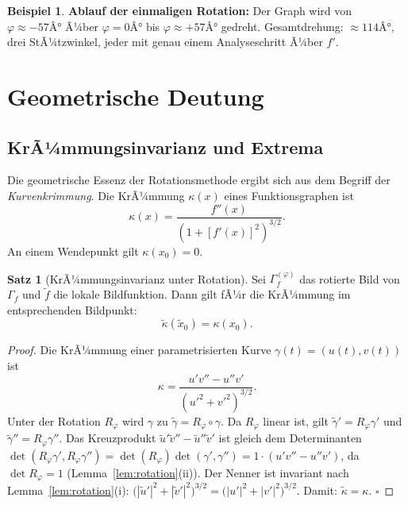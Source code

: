 ﻿\documentclass[12pt, a4paper]{article}
\theoremstyle{definition}
\newtheorem{satz}{Satz}[section]
\newtheorem{beispiel}{Beispiel}[section]
\begin{document}
\begin{beispiel}
		\textbf{Ablauf der einmaligen Rotation:}
		Der Graph wird von $\varphi \approx -57Â°$ Ã¼ber $\varphi = 0Â°$ bis
		$\varphi \approx +57Â°$ gedreht. Gesamtdrehung: $\approx 114Â°$,
		drei StÃ¼tzwinkel, jeder mit genau einem Analyseschritt Ã¼ber $f'$.
	\end{beispiel}
	
	\section{Geometrische Deutung}
	
	\subsection{KrÃ¼mmungsinvarianz und Extrema}
	
	Die geometrische Essenz der Rotationsmethode ergibt sich aus dem Begriff der
	\emph{Kurvenkrimmung}. Die KrÃ¼mmung $\kappa(x)$ eines Funktionsgraphen ist
	\[
	\kappa(x) = \frac{f''(x)}{\left(1 + [f'(x)]^2\right)^{3/2}}.
	\]
	An einem Wendepunkt gilt $\kappa(x_0) = 0$.
	
	\begin{satz}[KrÃ¼mmungsinvarianz unter Rotation]
		\label{satz:kruemmung}
		Sei $\Gamma_f^{(\varphi)}$ das rotierte Bild von $\Gamma_f$ und $\tilde{f}$
		die lokale Bildfunktion. Dann gilt fÃ¼r die KrÃ¼mmung im entsprechenden Bildpunkt:
		\[
		\tilde{\kappa}(\tilde{x}_0) = \kappa(x_0).
		\]
	\end{satz}
	
	\begin{proof}
		Die KrÃ¼mmung einer parametrisierten Kurve $\gamma(t) = (u(t), v(t))$ ist
		\[
		\kappa = \frac{u'v'' - u''v'}{(u'^2 + v'^2)^{3/2}}.
		\]
		Unter der Rotation $R_\varphi$ wird $\gamma$ zu $\tilde{\gamma} = R_\varphi \circ \gamma$.
		Da $R_\varphi$ linear ist, gilt $\tilde{\gamma}' = R_\varphi \gamma'$ und
		$\tilde{\gamma}'' = R_\varphi \gamma''$. Das Kreuzprodukt
		$\tilde{u}'\tilde{v}'' - \tilde{u}''\tilde{v}'$ ist gleich dem Determinanten
		$\det(R_\varphi \gamma', R_\varphi \gamma'') = \det(R_\varphi)\det(\gamma', \gamma'')
		= 1 \cdot (u'v'' - u''v')$, da $\det R_\varphi = 1$ (Lemma~\ref{lem:rotation}(ii)).
		Der Nenner ist invariant nach Lemma~\ref{lem:rotation}(i):
		$\bigl(|\tilde{u}'|^2 + |\tilde{v}'|^2\bigr)^{3/2} = \bigl(|u'|^2 + |v'|^2\bigr)^{3/2}$.
		Damit: $\tilde{\kappa} = \kappa$. $\square$
	\end{proof}
	
\end{document}

